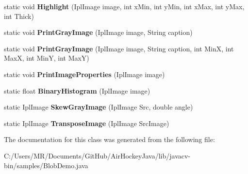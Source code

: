 \begin{DoxyCompactItemize}
\item 
\hypertarget{class_blob_demo_a9e9ba4ed199f5fc8a269b27e5adb874a}{}static void {\bfseries Highlight} (Ipl\+Image image, int x\+Min, int y\+Min, int x\+Max, int y\+Max, int Thick)\label{class_blob_demo_a9e9ba4ed199f5fc8a269b27e5adb874a}

\item 
\hypertarget{class_blob_demo_aae6998bfacef590bf665d4f95335e309}{}static void {\bfseries Print\+Gray\+Image} (Ipl\+Image image, String caption)\label{class_blob_demo_aae6998bfacef590bf665d4f95335e309}

\item 
\hypertarget{class_blob_demo_a8f4352d32fcebf10d9415b6003136c19}{}static void {\bfseries Print\+Gray\+Image} (Ipl\+Image image, String caption, int Min\+X, int Max\+X, int Min\+Y, int Max\+Y)\label{class_blob_demo_a8f4352d32fcebf10d9415b6003136c19}

\item 
\hypertarget{class_blob_demo_a8f58f4d62345726630e91e16cc174af9}{}static void {\bfseries Print\+Image\+Properties} (Ipl\+Image image)\label{class_blob_demo_a8f58f4d62345726630e91e16cc174af9}

\item 
\hypertarget{class_blob_demo_ae3c45835508558ac4b609ae17a1b5d7c}{}static float {\bfseries Binary\+Histogram} (Ipl\+Image image)\label{class_blob_demo_ae3c45835508558ac4b609ae17a1b5d7c}

\item 
\hypertarget{class_blob_demo_a5c8dad8785b6ca0adea8846b70b1ffd8}{}static Ipl\+Image {\bfseries Skew\+Gray\+Image} (Ipl\+Image Src, double angle)\label{class_blob_demo_a5c8dad8785b6ca0adea8846b70b1ffd8}

\item 
\hypertarget{class_blob_demo_affdd4a7c08bc8c7de501fc22093ecb42}{}static Ipl\+Image {\bfseries Transpose\+Image} (Ipl\+Image Src\+Image)\label{class_blob_demo_affdd4a7c08bc8c7de501fc22093ecb42}

\end{DoxyCompactItemize}


The documentation for this class was generated from the following file\+:\begin{DoxyCompactItemize}
\item 
C\+:/\+Users/\+M\+R/\+Documents/\+Git\+Hub/\+Air\+Hockey\+Java/lib/javacv-\/bin/samples/Blob\+Demo.\+java\end{DoxyCompactItemize}

